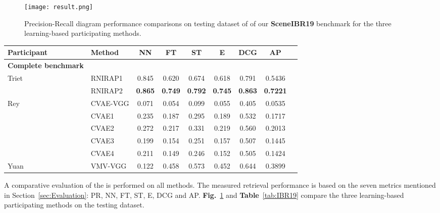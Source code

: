 \documentclass[../main.tex]{subfiles}
\begin{document}
\begin{figure}[!htp]
	\centering
	{
		\texttt{[image: result.png]}
	}
	\caption{ Precision-Recall diagram performance comparisons on testing dataset of of our \textbf{SceneIBR19} benchmark for the three learning-based participating methods.}
	\label{Results}
\end{figure}



\begin{table*}[!htb]
	\centering
	\caption{Performance metrics comparison on the SHREC'19 SceneIBR Track Benchmark.}
	\label{tab:IBR19}
	\begin{tabular}{llccccccc}
		\hline		
		\normalsize {\textbf{Participant}}	&\normalsize {\textbf{Method}} &\normalsize {\textbf{NN}}  &\normalsize {\textbf{FT}} &\normalsize {\textbf{ST}} &\normalsize {\textbf{E}} &\normalsize {\textbf{DCG}} &\normalsize {\textbf{AP}}\\
		\hline
		\textbf{\normalsize{Complete benchmark}}\\
		\hline
		\multirow{2}{*}{Triet} &RNIRAP1 &0.845    &0.620   &0.674   &0.618   &0.791  &  0.5436\\	
		\cline{2-8}
		&RNIRAP2 &\textbf{0.865}    &\textbf{0.749}   &\textbf{0.792}   &\textbf{0.745}   &\textbf{0.863} &\textbf{0.7221}\\	
		\hline  		 									
		\multirow{5}{*}{Rey} &CVAE-VGG &0.071    &0.054   &0.099   &0.055   &0.405 &0.0535\\ \cline{2-8}&CVAE1  &0.235    &0.187   &0.295   &0.189   &0.532 &0.1717\\
		\cline{2-8}
		&CVAE2 &0.272    &0.217   &0.331   &0.219   &0.560  &0.2013\\
		\cline{2-8}
		&CVAE3 &0.199    &0.154   &0.251   &0.157   &0.507 &0.1445\\
		\cline{2-8}
		&CVAE4 &0.211    &0.149   &0.246   &0.152   &0.505  &0.1424\\
		\hline							
		Yuan &VMV-VGG &0.122	 &0.458	 &0.573	 &0.452	 &0.644 &0.3899\\			
		\hline		
	\end{tabular}
\end{table*}

A comparative evaluation of the is performed on all methods. The measured retrieval performance is based on the seven metrics mentioned in Section~\ref{sec:Evaluation}: PR, NN, FT, ST, E, DCG and AP. \textbf{Fig.}~\ref{Results} and \textbf{Table}~\ref{tab:IBR19} compare the three learning-based participating methods on the testing dataset.
\end{document}
